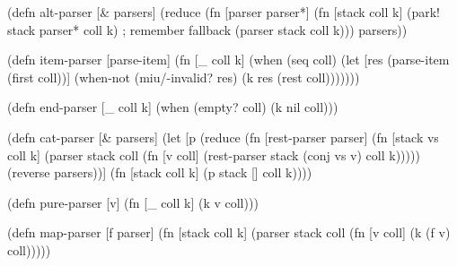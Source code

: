\documentclass{beamer}
\begin{document}

\begin{frame}[fragile]

{\scriptsize
\begin{semiverbatim}
(defn alt-parser [& parsers]
  (reduce (fn [parser parser*]
            (fn [stack coll k]
              (park! stack parser* coll k) ; remember fallback
              (parser stack coll k)))
          parsers))
\end{semiverbatim}
}

\end{frame}


\begin{frame}[fragile]

\begin{semiverbatim}
(defn item-parser [parse-item]
  (fn [_ coll k]
    (when (seq coll)
      (let [res (parse-item (first coll))]
        (when-not (miu/-invalid? res)
          (k res (rest coll)))))))
\end{semiverbatim}

\begin{semiverbatim}
(defn end-parser [_ coll k]
  (when (empty? coll)
    (k nil coll)))
\end{semiverbatim}

\end{frame}


\begin{frame}[fragile]

{\scriptsize
\begin{semiverbatim}
(defn cat-parser [& parsers]
  (let [p (reduce (fn [rest-parser parser]
                    (fn [stack vs coll k]
                      (parser stack coll
                              (fn [v coll]
                                (rest-parser stack (conj vs v) coll k)))))
                  (reverse parsers))]
    (fn [stack coll k] (p stack [] coll k))))
\end{semiverbatim}
}

\end{frame}


\begin{frame}[fragile]

\begin{semiverbatim}
(defn pure-parser [v] (fn [_ coll k] (k v coll)))
\end{semiverbatim}

\begin{semiverbatim}
(defn map-parser [f parser]
  (fn [stack coll k]
    (parser stack coll
            (fn [v coll] (k (f v) coll)))))
\end{semiverbatim}

\end{frame}
\end{document}
